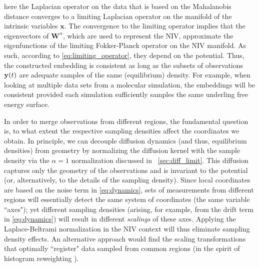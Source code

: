 here the Laplacian operator on the data that is based on the Mahalanobis distance converges to a limiting Laplacian operator on the
manifold of the intrinsic variables $\mathbf{x}$.
%
The convergence to the limiting operator implies that the eigenvectors of $\mathbf{W}^{\alpha}$, which are used to represent the NIV, approximate the eigenfunctions of the limiting Fokker-Planck operator on the NIV manifold.
%
As such, according to \eqref{eq:limiting_operator}, they depend on the potential.
%
Thus, the constructed embedding is consistent as long as the subsets of observations $\mathbf{y}(t)$ are
adequate samples of the same (equilibrium) density.
%
For example, when looking at multiple data sets from a molecular simulation, the embeddings will be consistent provided each simulation sufficiently samples the same underling free energy surface.

In order to merge observations from different regions,
the fundamental question is, to what extent the respective sampling densities affect the coordinates we obtain.
%
In principle, we can decouple diffusion dynamics (and thus, equilibrium densities)
from geometry by normalizing the diffusion kernel with the sample density via the $\alpha=1$ normalization discussed in \sec~\ref{sec:diff_limit}.
%
%
%
This diffusion captures only the geometry of the observations and is invariant to the potential (or, alternatively,
to the details of the sampling density).
%
Since local coordinates are based on the noise term in \eqref{eq:dynamics}, sets of measurements from different regions
will essentially detect the same system of coordinates (the same variable ``axes"); 
yet different sampling densities (arising, for example,
from the drift term in \eqref{eq:dynamics}) will result in different {\em scalings} of these axes.
%
Applying the Laplace-Beltrami normalization in the NIV context will thus eliminate sampling density effects.
%
An alternative approach would find the scaling transformations that optimally ``register"
data sampled from common regions (in the spirit of histogram reweighting \cite{ferrenberg1988new}).

